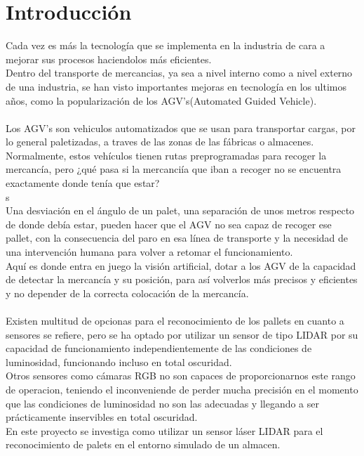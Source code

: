 
\section{Introducción}
Cada vez es más la tecnología que se implementa en la industria de cara a mejorar sus procesos haciendolos más eficientes. \\Dentro del transporte de mercancias, ya sea a nivel interno como a nivel externo de una industria, se han visto importantes mejoras en tecnología en los ultimos años, como la popularización de los AGV's(Automated Guided Vehicle). \\ \\
Los AGV's son vehiculos automatizados que se usan para transportar cargas, por lo general paletizadas,  a traves de las zonas de las fábricas o almacenes.
Normalmente, estos vehículos tienen rutas preprogramadas para recoger la mercancía, pero ¿qué pasa si la mercanciía que iban a recoger no se encuentra exactamente donde tenía que estar?\\s \\
Una desviación en el ángulo de un palet, una separación de unos metros respecto de donde debía estar, pueden hacer que el AGV no sea capaz de recoger ese pallet, con la consecuencia del paro en esa línea de transporte y la necesidad de una intervención humana para volver a retomar el funcionamiento.\\
Aquí es donde entra en juego la visión artificial, dotar a los AGV de la capacidad de detectar la mercancía y su posición, para así volverlos más precisos y eficientes y no depender de la correcta colocación de la mercancía. \\ \\
Existen multitud de opcionas para el reconocimiento de los pallets en cuanto a sensores se refiere, pero se ha optado por utilizar un sensor de tipo LIDAR por su capacidad de funcionamiento independientemente de las condiciones de luminosidad, funcionando incluso en total oscuridad.\\ Otros sensores como cámaras RGB no son capaces de proporcionarnos este rango de operacion, teniendo el inconveniende de perder mucha precisión en el momento que las condiciones de luminosidad no son las adecuadas y llegando a ser prácticamente inservibles en total oscuridad.\\
En este proyecto se investiga como utilizar un sensor láser LIDAR para el reconocimiento de palets en el entorno simulado de un almacen.\\

